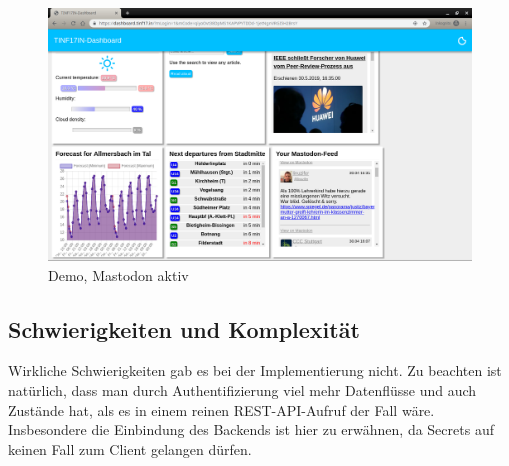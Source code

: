 \documentclass[fleqn,10pt]{SelfArx} %
\begin{document}
\begin{figure}
	\includegraphics[width=\linewidth]{images/3.png}
	\caption{Demo, Mastodon aktiv}
	\label{fig:demo3}
\end{figure}
\subsection{Schwierigkeiten und Komplexität}
Wirkliche Schwierigkeiten gab es bei der Implementierung nicht. Zu beachten ist natürlich, dass man durch Authentifizierung viel mehr Datenflüsse und auch Zustände hat, als es in einem reinen REST-API-Aufruf der Fall wäre. Insbesondere die Einbindung des Backends ist hier zu erwähnen, da Secrets auf keinen Fall zum Client gelangen dürfen.



\printbibliography%
\end{document}
